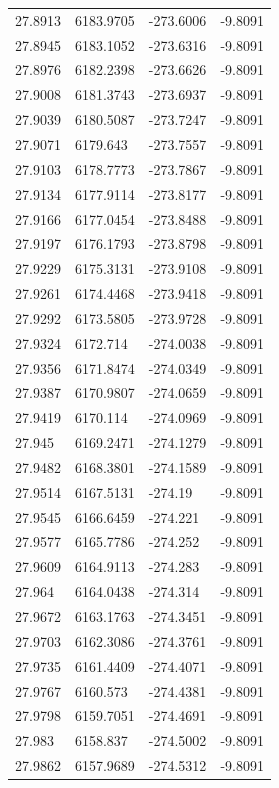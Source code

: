 \begin{table}[H]
\begin{tabular}{llll}
27.8913 & 6183.9705 & -273.6006 & -9.8091 \\
27.8945 & 6183.1052 & -273.6316 & -9.8091 \\
27.8976 & 6182.2398 & -273.6626 & -9.8091 \\
27.9008 & 6181.3743 & -273.6937 & -9.8091 \\
27.9039 & 6180.5087 & -273.7247 & -9.8091 \\
27.9071 & 6179.643 & -273.7557 & -9.8091 \\
27.9103 & 6178.7773 & -273.7867 & -9.8091 \\
27.9134 & 6177.9114 & -273.8177 & -9.8091 \\
27.9166 & 6177.0454 & -273.8488 & -9.8091 \\
27.9197 & 6176.1793 & -273.8798 & -9.8091 \\
27.9229 & 6175.3131 & -273.9108 & -9.8091 \\
27.9261 & 6174.4468 & -273.9418 & -9.8091 \\
27.9292 & 6173.5805 & -273.9728 & -9.8091 \\
27.9324 & 6172.714 & -274.0038 & -9.8091 \\
27.9356 & 6171.8474 & -274.0349 & -9.8091 \\
27.9387 & 6170.9807 & -274.0659 & -9.8091 \\
27.9419 & 6170.114 & -274.0969 & -9.8091 \\
27.945 & 6169.2471 & -274.1279 & -9.8091 \\
27.9482 & 6168.3801 & -274.1589 & -9.8091 \\
27.9514 & 6167.5131 & -274.19 & -9.8091 \\
27.9545 & 6166.6459 & -274.221 & -9.8091 \\
27.9577 & 6165.7786 & -274.252 & -9.8091 \\
27.9609 & 6164.9113 & -274.283 & -9.8091 \\
27.964 & 6164.0438 & -274.314 & -9.8091 \\
27.9672 & 6163.1763 & -274.3451 & -9.8091 \\
27.9703 & 6162.3086 & -274.3761 & -9.8091 \\
27.9735 & 6161.4409 & -274.4071 & -9.8091 \\
27.9767 & 6160.573 & -274.4381 & -9.8091 \\
27.9798 & 6159.7051 & -274.4691 & -9.8091 \\
27.983 & 6158.837 & -274.5002 & -9.8091 \\
27.9862 & 6157.9689 & -274.5312 & -9.8091 \\

\end{tabular}
\end{table}
